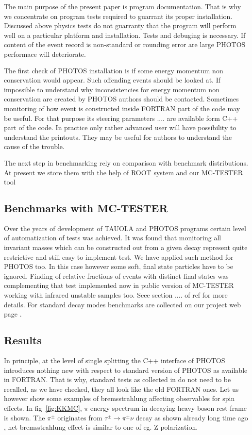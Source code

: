 \documentclass[]{Photos_interface_design}
\begin{document}
The main purpose of the present paper is program documentation. That is why
we concentrate on program tests required to guarrant its proper installation.
Discussed above physics tests
do not guarranty that the program will perform well on a particular platform and installation. Tests and debuging
is necessary.  If content of the event record is non-standard or rounding error are large PHOTOS performace will deteriorate.

The first check of PHOTOS installation is if some energy momentum non 
conservation would appear. Such offending events should be looked at.
If impossible to understand why inconsistencies for energy momentum non 
conservation are created by PHOTOS authors should be contacted. Sometimes
monitoring of how event is constructed inside FORTRAN part of the code
may be useful. For that purpose its steering parameters .... are
available form C++ part of the code. In practice only rather
 advanced user will have possibility to understand the printouts. They may be 
useful for authors to understand the cause of the trouble.

The next step in benchmarking rely on comparison with benchmark distributions. 
At present we store them with the help of ROOT system and our MC-TESTER tool



\subsection{Benchmarks with MC-TESTER}
Over the years of development of TAUOLA and PHOTOS programs certain level 
of automatization of tests was achieved. It was found that monitoring all invariant masses which can be constructed out from a given decay represent 
quite restrictive and still easy to implement test. We have applied such method 
for PHOTOS too. In this case however some soft, final state particles have to be ignored. Finding of relative fractions of events with distinct final states 
was complementing that test implemented now in public version of MC-TESTER
working with infrared unstable samples too. Seee section .... of 
ref \cite{Davidson:2008ma} for more details. For standard decay modes benchmarks are collected on our project web page \cite{Photos_tests}.

\subsection{Results}
In principle, at the level of single splitting the C++ interface of PHOTOS
introduces nothing new with respect to standard version of PHOTOS as available 
in FORTRAN. That is why, standard tests as collected in \cite{Photos_tests} do not need 
to be recalled, as we have checked, they all look like the old FORTRAN ones.
Let us however show some examples of bremsstrahlung affecting observables
for spin effects. In  fig~\ref{fig:KKMC}, $\pi$ energy spectrum in decaying
heavy boson rest-frame is shown. The $\pi^\pm$ originates from $\tau^\pm \to \pi^\pm \nu $ decay as shown already long time ago \cite{Boillot:1988re}, net
bremsstrahlung  effect is similar 
to one of eg. Z polarization.
\end{document}
